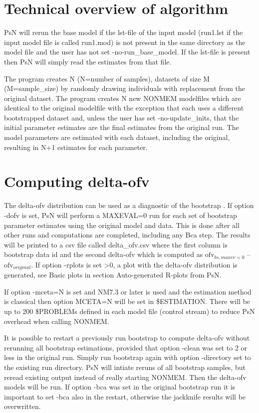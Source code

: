 \section{Technical overview of algorithm}

PsN will rerun the base model if the lst-file of the input model (run1.lst if the input model file is called run1.mod) is not present in the same directory as the model file 
and the user has not set -no-run\_base\_model. If the lst-file is present then PsN will simply read the estimates from that file.

The program creates N (N=number of samples), datasets of size M (M=sample\_size) by randomly drawing individuals with replacement from the original dataset. The program creates N new NONMEM modelfiles which are identical to the original modelfile with the exception that each uses a different  bootstrapped dataset and, 
unless the user has set -no-update\_inits,
that the initial parameter estimates are the final estimates from the original run. 
The model parameters are estimated with each dataset, including the original, resulting in N+1 estimates for each parameter.

\section{Computing delta-ofv}

The delta-ofv distribution can be used as a 
diagnostic of the bootstrap \cite{Niebecker}.
If option -dofv is set, PsN will perform a MAXEVAL=0 run for each set of bootstrap parameter estimates using the original model and data. This is done after all other runs and computations are completed, including any Bca step. The results will be printed to a csv file called delta\_ofv.csv where the first column is bootstrap data id and the second delta-ofv which is computed as 
$\mathrm{ofv}_{bs,maxev=0}$ – $\mathrm{ofv}_{original}$. 
If option -rplots is set >0, a plot with the delta-ofv distribution is
generated, see Basic plots in section Auto-generated R-plots from PsN. 

If option -mceta=N is set and NM7.3 or later is used and the estimation method is classical then option MCETA=N will be set in \$ESTIMATION. There will be up to 200 \$PROBLEMs defined in each model file (control stream) to reduce PsN overhead when calling NONMEM.

It is possible to restart a previously run bootstrap to compute delta-ofv without rerunning all bootstrap estimations, provided that option -clean was set to 2 or less in the original run. Simply run bootstrap again with option -directory set to the existing run directory. PsN will intiate reruns of all bootstrap samples, but reread existing output instead of really starting NONMEM. Then the delta-ofv models will be run. If option -bca was set in the original bootstrap run it is important to set -bca also in the restart, otherwise the jackknife results will be overwritten. 

